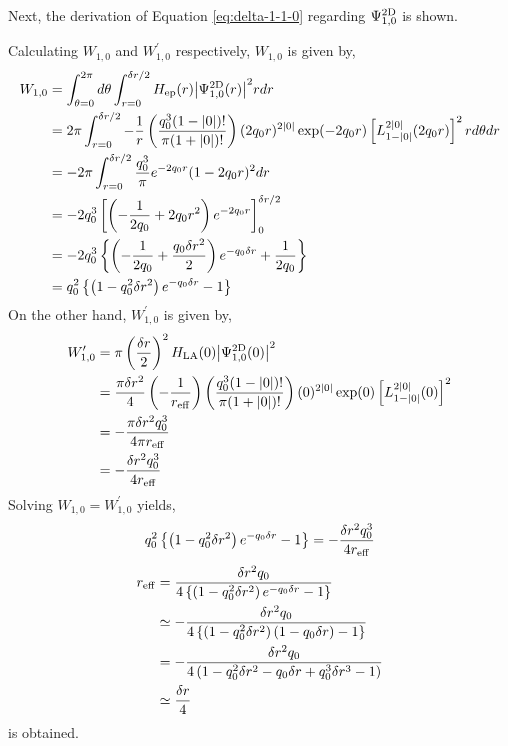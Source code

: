 \documentclass[wabun2025.tex]{subfiles}
\begin{document}
Next, the derivation of Equation \eqref{eq:delta-1-1-0} regarding $\Psi^{\mathrm{2D}}_{1,0}$ is shown.

Calculating $W_{1,0}$ and $W_{1,0}^\prime$ respectively, $W_{1,0}$ is given by,
\begin{align}
  W_{1,0}
   &= \int_{\theta=0}^{2\pi}d\theta
      \int_{r=0}^{\delta r/2}H_{\mathrm{ep}}(r){\left| \Psi^{\mathrm{2D}}_{1,0}(r) \right|}^2r dr\notag\\
   &= 2\pi\int_{r=0}^{\delta r/2}
      -\frac{1}{r}\left(\frac{q_0^3(1-{\left| 0 \right|})!}{\pi(1+{\left| 0 \right|})!}\right)
      (2q_0r)^{2{\left| 0 \right|}}\exp(-2q_0r)
      \left[L_{1-{\left| 0 \right|}}^{2{\left| 0 \right|}}(2q_0r)\right]^2 rd\theta dr\notag\\
   &= -2\pi\int_{r=0}^{\delta r/2}\frac{q_0^3}{\pi}e^{-2q_0r}(1-2q_0r)^2dr\notag\\
   &= -2q_0^3\left[\left(-\frac{1}{2q_0}+2q_0r^2\right)e^{-2q_0r}\right]_{0}^{\delta r/2} \notag\\
   &= -2q_0^3\left\{\left(-\frac{1}{2q_0}+\frac{q_0\delta r^2}{2}\right)e^{-q_0\delta r}+\frac{1}{2q_0}\right\}\notag\\
   &= q_0^2\left\{\left(1-q_0^2\delta r^2\right)e^{-q_0\delta r}-1\right\}
\end{align}
On the other hand, $W_{1,0}^\prime$ is given by,
\begin{align}
    W_{1,0}^\prime
    &=\pi\left(\frac{\delta r}{2}\right)^2
         H_{\mathrm{LA}}(0){\left| \Psi^{\mathrm{2D}}_{1,0}(0) \right|}^2\notag\\
    &=\frac{\pi\delta r^2}{4}\left(-\frac{1}{r_{\mathrm{eff}}}\right)
    \left(\frac{q_0^3(1-{\left| 0 \right|})!}{\pi(1+{\left| 0 \right|})!}\right)
    (0)^{2{\left| 0 \right|}}\exp(0)\left[L_{1-{\left| 0 \right|}}^{2{\left| 0 \right|}}(0)\right]^2\notag\\
    &= -\frac{\pi\delta r^2q_0^3}{4\pi r_{\mathrm{eff}}}\notag\\
    &= -\frac{\delta r^2q_0^3}{4r_{\mathrm{eff}}}
\end{align}
Solving $W_{1,0}=W_{1,0}^\prime$ yields,
\begin{equation}
q_0^2\left\{\left(1-q_0^2\delta r^2\right)e^{-q_0\delta r}-1\right\}
=-\frac{\delta r^2q_0^3}{4r_{\mathrm{eff}}}
\end{equation}
\begin{align}
r_{\mathrm{eff}}&=\frac{\delta r^2q_0}{4\left\{\left(1-q_0^2\delta r^2\right)e^{-q_0\delta r}-1\right\}}\notag\\
&\simeq-\frac{\delta r^2q_0}{4\left\{\left(1-q_0^2\delta r^2\right)(1-q_0\delta r)-1\right\}}\notag\\
&=-\frac{\delta r^2q_0}{4\left(1-q_0^2\delta r^2-q_0\delta r+q_0^3\delta r^3-1\right)}\notag\\
&\simeq\frac{\delta r}{4}
\end{align}
is obtained.
\end{document}
